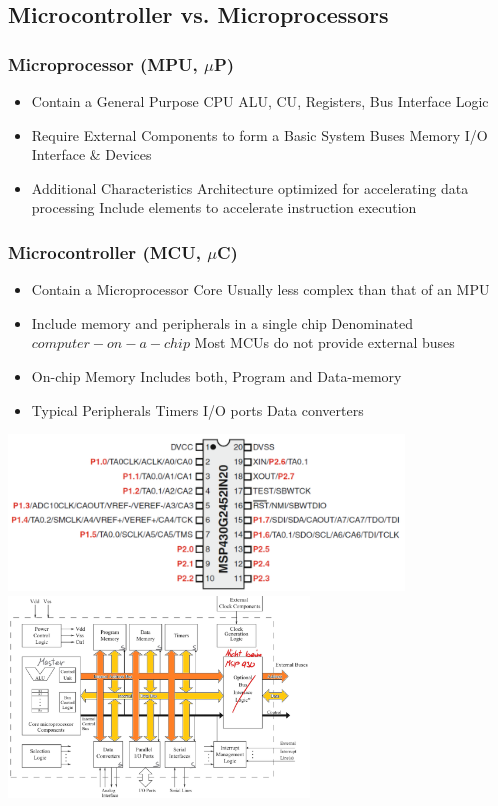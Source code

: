 \subsection{Microcontroller vs. Microprocessors }
\begin{multicols}{2}
		\subsubsection{Microprocessor (\acs{MPU}, $\mu$P) }
		\begin{itemize}
			\item Contain a General Purpose \acs{CPU}
			\subitem \acs{ALU}, \acs{CU}, Registers, Bus Interface Logic
			\item Require External Components to form a Basic System
			\subitem Buses
			\subitem Memory
			\subitem \acs{I/O} Interface \& Devices
			\item Additional Characteristics
			\subitem Architecture optimized for \newline accelerating data processing
			\subitem Include elements to accelerate instruction execution  
		\end{itemize}
\subsubsection{Microcontroller (\acs{MCU},  $\mu$C)}
		\begin{itemize}
			\item Contain a Microprocessor Core
			\subitem Usually less complex than that of an \acs{MPU}
			\item Include memory and peripherals in a single chip
			\subitem Denominated $ computer-on-a-chip $ 
			\subitem Most \acs{MCU}s do not provide external buses
			\item On-chip Memory
			\subitem Includes both, Program and Data-memory
			\item Typical Peripherals
			\subitem Timers
			\subitem \acs{I/O} ports
			\subitem Data converters
		\end{itemize}
\end{multicols}

    \includegraphics[width=10.5cm]{images/msp430hardware}
	\includegraphics[width=8cm]{images/mCStructure}


